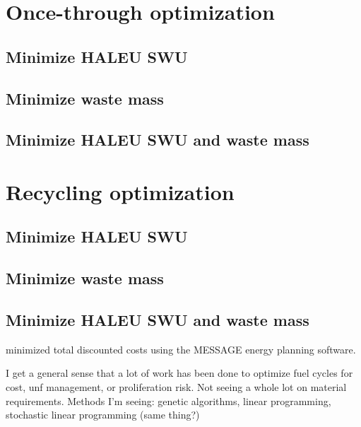 \section{Once-through optimization}
\subsection{Minimize HALEU SWU}

\subsection{Minimize waste mass}

\subsection{Minimize HALEU SWU and waste mass}

\section{Recycling optimization}
\subsection{Minimize HALEU SWU}

\subsection{Minimize waste mass}

\subsection{Minimize HALEU SWU and waste mass}



\cite{andrianov_optimization_2019} minimized total discounted costs using 
the MESSAGE energy planning software. 

I get a general sense that a lot of work has been done to optimize fuel cycles 
for cost, unf management, or proliferation risk. Not seeing a whole lot on 
material requirements. 
Methods I'm seeing: genetic algorithms, linear programming, stochastic linear 
programming (same thing?)
